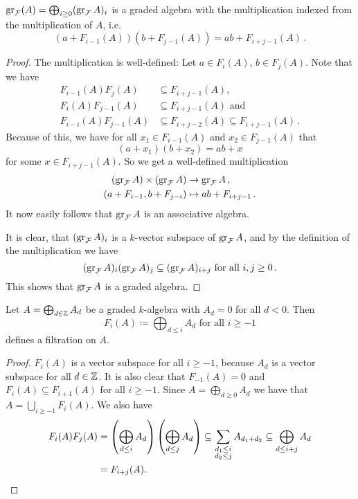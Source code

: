 \begin{lemma}
  $\operatorname{gr}_\mathcal{F}(A) = \bigoplus_{i \geq 0} (\operatorname{gr}_\mathcal{F}A)_i$ is a graded algebra with the multiplication indexed from the multiplication of $A$, i.e.\
  \[
      ( a + F_{i-1}(A) )( b + F_{j-1}(A) )
    = ab + F_{i+j-1}(A) \,.
  \]
\end{lemma}
\begin{proof}
  The multiplication is well-defined: Let $a \in F_i(A)$, $b \in F_j(A)$. Note that we have
  \begin{align*}
                F_{i-1}(A)F_j(A)
    &\subseteq  F_{i+j-1}(A), \\
                F_i(A) F_{j-1}(A)
    &\subseteq  F_{i+j-1}(A) \text{ and } \\
                F_{i-i}(A)F_{j-1}(A)
    &\subseteq  F_{i+j-2}(A) \subseteq F_{i+j-1}(A) \,.
  \end{align*}
  Because of this, we have for all $x_1 \in F_{i-1}(A)$ and $x_2 \in F_{j-1}(A)$ that
  \[
      (a + x_1)(b + x_2)
    = a b + x
  \]
  for some $x \in F_{i+j-1}(A)$. So we get a well-defined multiplication
  \begin{align*}
              (\operatorname{gr}_\mathcal{F} A) \times (\operatorname{gr}_\mathcal{F} A)
    &\to      \operatorname{gr}_\mathcal{F} A \,,
    \\
              (a + F_{i-1}, b + F_{j-i})
    &\mapsto  ab + F_{i+j-1} \,.
  \end{align*}
  It now easily follows that $\operatorname{gr}_\mathcal{F} A$ is an associative algebra.
  
  It is clear, that $(\operatorname{gr}_\mathcal{F} A)_i$ is a $k$-vector subspace of $\operatorname{gr}_\mathcal{F} A$, and by the definition of the multiplication we have
  \[
              (\operatorname{gr}_\mathcal{F} A)_i (\operatorname{gr}_\mathcal{F} A)_j
    \subseteq (\operatorname{gr}_\mathcal{F} A)_{i+j}
    \text{ for all }
    i,j \geq 0 \,.
  \]
  This shows that $\operatorname{gr}_\mathcal{F} A$ is a graded algebra.
\end{proof}


\begin{lemma}
  Let $A = \bigoplus_{d \in \mathbb{Z}} A_d$ be a graded $k$-algebra with $A_d = 0$ for all $d < 0$.
  Then
  \[
              F_i(A)
    \coloneqq \bigoplus_{d \leq i} A_d
    \text{ for all }
    i \geq -1
  \]
  defines a filtration on $A$.
\end{lemma}
\begin{proof}
  $F_i(A)$ is a vector subspace for all $i \geq -1$, because $A_d$ is a vector subspace for all $d \in \mathbb{Z}$.
  It is also clear that $F_{-1}(A) = 0$ and $F_i(A) \subseteq F_{i+1}(A)$ for all $i \geq -1$.
  Since $A = \bigoplus_{d \geq 0} A_d$ we have that $A = \bigcup_{i \geq -1} F_i(A)$.
  We also have
  \begin{align*}
              F_i(A) F_j(A)
    &=        \left( \bigoplus_{d \leq i} A_d \right) \left( \bigoplus_{d \leq j} A_d \right)
    \subseteq \sum_{\substack{d_1 \leq i \\ d_2 \leq j}} A_{d_1 + d_2}
    \subseteq \bigoplus_{d \leq i+j} A_d \\
    &=        F_{i+j}(A).
    \qedhere
  \end{align*}
\end{proof}


